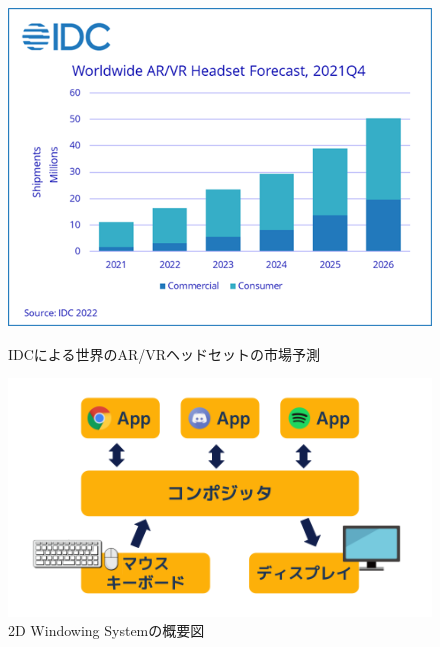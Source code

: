 \begin{figure}[htbp]
  \begin{minipage}[b]{0.50\linewidth}
    \centering
    \includegraphics[keepaspectratio, width=0.9\linewidth]{fig/idc.png}
    \caption{IDCによる世界のAR/VRヘッドセットの市場予測}
    \label{fig:idc}
  \end{minipage}
  \begin{minipage}[t]{0.50\linewidth}
    \centering
    \includegraphics[keepaspectratio, width=\linewidth]{fig/2d-windowing-system.png}
    \caption{2D Windowing Systemの概要図}
    \label{fig:2d-windowing-system}
  \end{minipage}
\end{figure}


